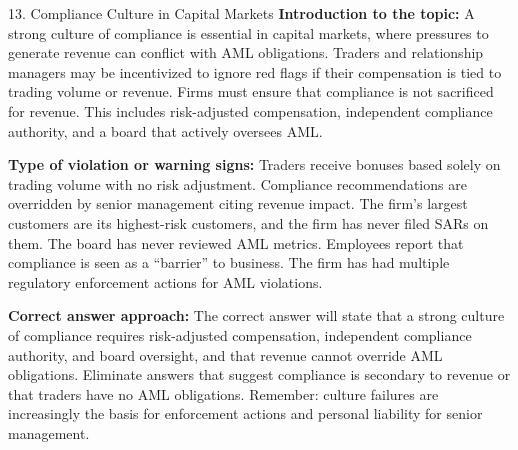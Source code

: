 \documentclass[11pt,a4paper]{beamer}
\begin{document}
\begin{frame}{13. Compliance Culture in Capital Markets}
\tiny
\noindent\textbf{Introduction to the topic:} A strong culture of compliance is essential in capital markets, where pressures to generate revenue can conflict with AML obligations. Traders and relationship managers may be incentivized to ignore red flags if their compensation is tied to trading volume or revenue. Firms must ensure that compliance is not sacrificed for revenue. This includes risk-adjusted compensation, independent compliance authority, and a board that actively oversees AML.

\vspace{0.1cm}
\noindent\textbf{Type of violation or warning signs:} Traders receive bonuses based solely on trading volume with no risk adjustment. Compliance recommendations are overridden by senior management citing revenue impact. The firm's largest customers are its highest-risk customers, and the firm has never filed SARs on them. The board has never reviewed AML metrics. Employees report that compliance is seen as a “barrier” to business. The firm has had multiple regulatory enforcement actions for AML violations.

\vspace{0.1cm}
\noindent\textbf{Correct answer approach:} The correct answer will state that a strong culture of compliance requires risk-adjusted compensation, independent compliance authority, and board oversight, and that revenue cannot override AML obligations. Eliminate answers that suggest compliance is secondary to revenue or that traders have no AML obligations. Remember: culture failures are increasingly the basis for enforcement actions and personal liability for senior management.
\end{frame}
\end{document}
